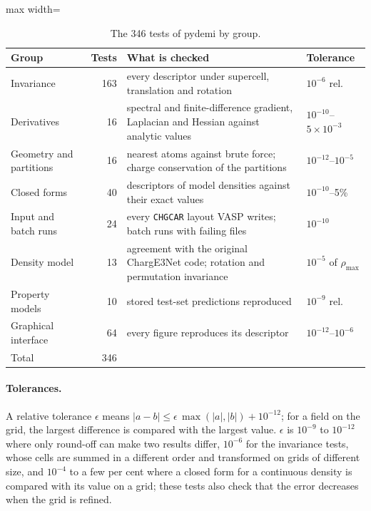 \documentclass[journal=jctcce,manuscript=suppinfo,email=true]{achemso}
\newcommand{\rev}[1]{{\color{blue}#1}}
\begin{document}
\begin{table}[!htbp]
\centering
\caption{The \rev{346} tests of pydemi by group.}
\label{tab:si_tests}
\small
\begin{adjustbox}{max width=\textwidth}
\begin{tabular}{@{}lr>{\raggedright\arraybackslash}p{7.2cm}l@{}}
\toprule
Group & Tests & What is checked & Tolerance \\
\midrule
Invariance & \rev{163} & every descriptor under supercell, translation and rotation & $10^{-6}$ rel. \\
Derivatives & 16 & spectral and finite-difference gradient, Laplacian and Hessian against analytic values & $10^{-10}$--$5\times10^{-3}$ \\
Geometry and partitions & \rev{16} & nearest atoms against brute force; charge conservation of the partitions & $10^{-12}$--$10^{-5}$ \\
Closed forms & 40 & descriptors of model densities against their exact values & $10^{-10}$--5\% \\
Input and batch runs & 24 & every \texttt{CHGCAR} layout VASP writes; batch runs with failing files & $10^{-10}$ \\
Density model & 13 & agreement with the original ChargE3Net code; rotation and permutation invariance & $10^{-5}$ of $\rho_{\max}$ \\
Property models & \rev{10} & stored test-set predictions reproduced & $10^{-9}$ rel. \\
Graphical interface & 64 & every figure reproduces its descriptor & $10^{-12}$--$10^{-6}$ \\
\midrule
Total & \rev{346} & & \\
\bottomrule
\end{tabular}
\end{adjustbox}
\end{table}

\paragraph{Tolerances.} A relative tolerance $\epsilon$ means
$|a-b|\le\epsilon\,\max(|a|,|b|)+10^{-12}$; for a field on the grid, the largest
difference is compared with the largest value. $\epsilon$ is $10^{-9}$ to
$10^{-12}$ where only round-off can make two results differ, $10^{-6}$ for the
invariance tests, whose cells are summed in a different order and transformed on
grids of different size, and $10^{-4}$ to a few per cent where a closed form for a
continuous density is compared with its value on a grid; these tests also check
that the error decreases when the grid is refined.
\end{document}
